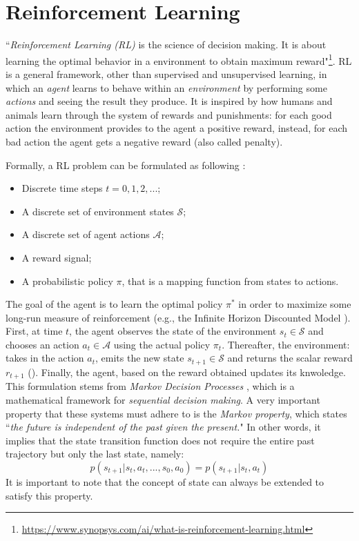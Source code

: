 \documentclass[12pt,a4paper,openright,twoside]{book}
\begin{document}
%
\section{Reinforcement Learning}
%

``\emph{Reinforcement Learning (RL)} is the science of decision making. It is about learning the optimal behavior 
    in a environment to obtain maximum reward"\footnote{\url{https://www.synopsys.com/ai/what-is-reinforcement-learning.html}}.
    RL is a general framework, other than supervised and unsupervised learning, in which an \emph{agent} learns 
    to behave within an \emph{environment} by performing some \emph{actions} and seeing the result they produce.
    It is inspired by how humans and animals learn through the system of rewards and punishments: for each good action
    the environment provides to the agent a positive reward, instead, for each bad action the agent gets a negative 
    reward (also called penalty).

Formally, a RL problem can be formulated as following \cite{RLSurvey}:
    \begin{itemize}
        \item Discrete time steps $t=0, 1, 2, ...$;
        \item A discrete set of environment states $\mathcal{S}$;
        \item A discrete set of agent actions $\mathcal{A}$;
        \item A reward signal;
        \item A probabilistic policy $\pi$, that is a mapping function from states to actions.
    \end{itemize}
    The goal of the agent is to learn the optimal policy $\pi^*$ in order to maximize 
        some long-run measure of reinforcement (e.g., the Infinite Horizon Discounted Model \cite{RLSurvey}).
        First, at time $t$, the agent observes the state of the environment $s_t \in \mathcal{S}$
        and chooses an action $a_t \in \mathcal{A}$ using the actual policy $\pi_t$. 
        Thereafter, the environment: takes in the action $a_t$, emits the new state $s_{t+1} \in \mathcal{S}$ 
        and returns the scalar reward $r_{t+1}$ ().
        Finally, the agent, based on the reward obtained updates its knwoledge.
    This formulation stems from \emph{Markov Decision Processes} \cite{garcia2013markov, puterman1990markov}, which is a mathematical framework for \emph{sequential decision making}. A very important property that these systems must adhere to is the \emph{Markov property}, which states ``\emph{the future is independent of the past given the present.}" In other words, it implies that the state transition function does not require the entire past trajectory but only the last state, namely: 
    $$p(s_{t+1} | s_t, a_t, ..., s_0, a_0) = p(s_{t+1} | s_t, a_t)$$
    It is important to note that the concept of state can always be extended to satisfy this property.
\end{document}

